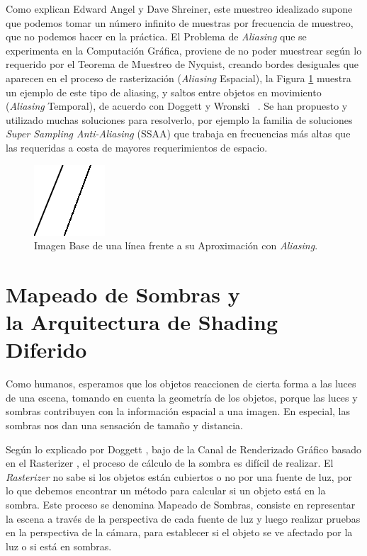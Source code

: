 \documentclass[pregrado]{tesis-usb} %
\begin{document}
Como explican Edward Angel y Dave Shreiner, este muestreo idealizado supone que podemos tomar un número infinito de muestras por frecuencia de muestreo, que no podemos hacer en la práctica. El Problema de \textit{Aliasing} que se experimenta en la Computación Gráfica, proviene de no poder muestrear según lo requerido por el Teorema de Muestreo de Nyquist, creando bordes desiguales que aparecen en el proceso de rasterización (\textit{Aliasing} Espacial), la Figura \ref{fig:aliasingexample} muestra un ejemplo de este tipo de aliasing, y saltos entre objetos en movimiento (\textit{Aliasing} Temporal), de acuerdo con Doggett y Wronski ~\cite{Doggett2017EDAN35, Wronski2014}. Se han propuesto y utilizado muchas soluciones para resolverlo, por ejemplo la familia de soluciones \textit{Super Sampling Anti-Aliasing} (SSAA) que trabaja en frecuencias más altas que las requeridas a costa de mayores requerimientos de espacio.

\begin{figure}[!hbt]
	\centering
	\includegraphics[scale=0.6]{images/aliasing_example.png} 
	\caption{Imagen Base de una línea frente a su Aproximación con \textit{Aliasing}.}\label{fig:aliasingexample}
\end{figure}

\section[Mapeado de Sombras y la Arquitectura de Shading Diferido]{Mapeado de Sombras y \\ la Arquitectura de Shading Diferido}

Como humanos, esperamos que los objetos reaccionen de cierta forma a las luces de una escena, tomando en cuenta la geometría de los objetos, porque las luces y sombras contribuyen con la información espacial a una imagen. En especial, las sombras nos dan una sensación de tamaño y distancia.

Según lo explicado por Doggett \cite{Doggett2017EDAN35}, bajo de la Canal de Renderizado Gráfico basado en el Rasterizer , el proceso de cálculo de la sombra es difícil de realizar. El \textit{Rasterizer} no sabe si los objetos están cubiertos o no por una fuente de luz, por lo que debemos encontrar un método para calcular si un objeto está en la sombra. Este proceso se denomina Mapeado de Sombras, consiste en representar la escena a través de la perspectiva de cada  fuente de luz y luego realizar pruebas en la perspectiva de la cámara, para establecer si el objeto se ve afectado por la luz o si está en sombras.
\end{document}
